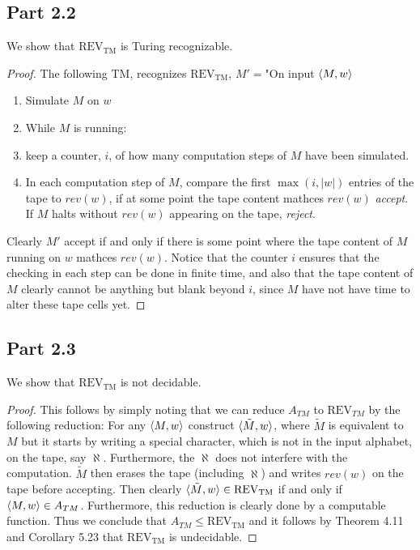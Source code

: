 \documentclass[a4paper,11pt]{article}
\newcommand{\abs}[1]{\left\lvert #1 \right\rvert}
\numberwithin{equation}{section}
\begin{document}
	\subsection*{Part 2.2}
	We show that $ \text{REV}_{\text{TM}} $ is Turing recognizable.
	\begin{proof}
		The following TM, recognizes $ \text{REV}_{\text{TM}} $, $ M'= $"On input $ \braket{M,w} $\begin{enumerate}
			\item Simulate $ M $ on $ w $ 
			\item While $ M $ is running: 
			\item\qquad keep a counter, $ i $, of how many computation steps of $ M $ have been simulated.
			
			\item \begin{addmargin}[2em]{0em}In each computation step of $ M $, compare the first $ \max(i,\abs{w}) $ entries of the tape to $ rev(w) $, if at some point the tape content mathces $ rev(w) $ \emph{accept}. If $ M $ halts without $ rev(w) $ appearing on the tape, \emph{reject}.
				\end{addmargin}
		\end{enumerate}
		Clearly $ M' $ accept if and only if there is some point where the tape content of $ M $ running on $ w $ mathces $ rev(w) $. Notice that the counter $ i $ ensures that the checking in each step can be done in finite time, and also that the tape content of $ M $ clearly cannot be anything but blank beyond $ i $, since $ M $ have not have time to alter these tape cells yet.
	\end{proof} 
	\subsection*{Part 2.3}
	We show that $ \text{REV}_{\text{TM}} $ is not decidable.
	\begin{proof}
		This follows by simply noting that we can reduce $ A_{TM} $ to $ \text{REV}_{TM} $ by the following reduction: For any $ \braket{M,w} $ construct $ \braket{\tilde{M},w} $, where $ \tilde{M} $ is equivalent to $ M $ but it starts by writing a special character, which is not in the input alphabet, on the tape, say $\aleph $. Furthermore, the $\aleph $ does not interfere with the computation. $ \tilde{M} $ then erases the tape (including $ \aleph $) and writes $ rev(w) $ on the tape before accepting. Then clearly $ \braket{\tilde{M},w}\in \text{REV}_{\text{TM}} $ if and only if $ \braket{M,w}\in A_{TM} $. Furthermore, this reduction is clearly done by a computable function. Thus we conclude that $ A_{TM}\leq \text{REV}_{\text{TM}} $ and it follows by Theorem 4.11 and Corollary 5.23 that $ \text{REV}_{\text{TM}} $ is undecidable.
	\end{proof}
	
\end{document}

